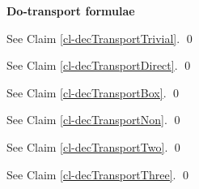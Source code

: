 {\bf Do-transport formulae}

\begin{claim}
\decTransportTrivial
\end{claim}
\proof
See Claim \ref{cl-decTransportTrivial}.
\qed


\begin{claim}
\decTransportDirect
\end{claim}
\proof
See Claim \ref{cl-decTransportDirect}.
\qed


\begin{claim}
\decTransportBox
\end{claim}
\proof
See Claim 
\ref{cl-decTransportBox}.
\qed



\begin{claim}
\decTransportNon
\end{claim}
\proof
See Claim 
\ref{cl-decTransportNon}.
\qed

\begin{claim}
\decTransportTwo
\end{claim}
\proof
See Claim \ref{cl-decTransportTwo}.
\qed

\begin{claim}
\decTransportThree
\end{claim}
\proof
See Claim \ref{cl-decTransportThree}.
\qed